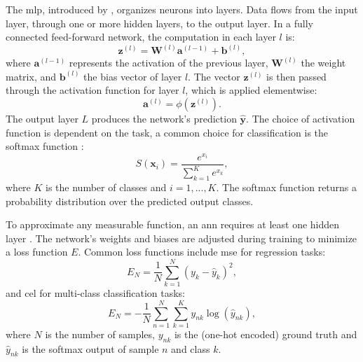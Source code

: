 \documentclass[12pt, a4paper, headinclude, twoside, plainheadsepline, open=right, numbers=noenddot, hidelinks, toc=listof, toc=bibliography]{scrreprt}
\begin{document}
The \ac{mlp}, introduced by \citeauthor{rosenblattPerceptronProbabilisticModel1958} \cite{rosenblattPerceptronProbabilisticModel1958}, organizes neurons into layers. 
Data flows from the input layer, through one or more hidden layers, to the output layer. In a fully connected feed-forward network, the computation in each layer $l$ is:
\begin{equation}
\mathbf{z}^{(l)} = \mathbf{W}^{(l)} \mathbf{a}^{(l-1)} + \mathbf{b}^{(l)},
\label{eq:ann_zl}
\end{equation}
where $\mathbf{a}^{(l-1)}$ represents the activation of the previous layer, $\mathbf{W}^{(l)}$ the weight matrix, and $\mathbf{b}^{(l)}$ the bias vector of layer $l$.
The vector $\mathbf{z}^{(l)}$ is then passed through the activation function for layer $l$, which is applied elementwise:
\begin{equation}
\mathbf{a}^{(l)} = \phi (\mathbf{z}^{(l)}).
\label{eq:ann_yhat}
\end{equation}
The output layer $L$ produces the network's prediction $\mathbf{\hat{y}}$.
The choice of activation function is dependent on the task, a common choice for classification is the softmax function \cite{bridleProbabilisticInterpretationFeedforward1990}:
\begin{equation}
\label{eq:softmax}
 S(\mathbf{x}_i) = \frac{e^{x_i}}{\sum_{k=1}^{K} e^{x_k}},
\end{equation}
where $K$ is the number of classes and $i = 1, ..., K$.
The softmax function returns a probability distribution over the predicted output classes.

To approximate any measurable function, an \ac{ann} requires at least one hidden layer \cite{hornikMultilayerFeedforwardNetworks1989}. 
The network's weights and biases are adjusted during training to minimize a loss function $E$.
Common loss functions include \ac{mse} for regression tasks:
\begin{equation}
E_N = \frac{1}{N} \sum_{k=1}^{N}(y_{k} - \hat{y}_{k})^2,
\end{equation}
and \ac{cel} for multi-class classification tasks:
\begin{equation}
E_N = -\frac{1}{N} \sum_{n=1}^{N} \sum_{k=1}^{K} y_{nk} \log (\hat{y}_{nk}),
\end{equation}
where $N$ is the number of samples, $y_{nk}$ is the (one-hot encoded) ground truth and $\hat{y}_{nk}$ is the softmax output of sample $n$ and class $k$.
\end{document}
